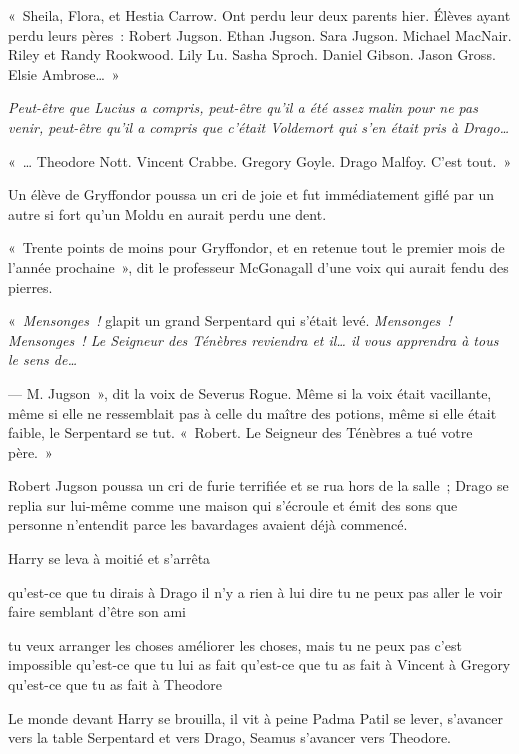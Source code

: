 «~Sheila, Flora, et Hestia Carrow. Ont perdu leur deux parents hier. Élèves ayant perdu leurs pères~: Robert Jugson. Ethan Jugson. Sara Jugson. Michael MacNair. Riley et Randy Rookwood. Lily Lu. Sasha Sproch. Daniel Gibson. Jason Gross. Elsie Ambrose…~»

\emph{Peut-être que Lucius a compris, peut-être qu'il a été assez malin pour ne pas venir, peut-être qu'il a compris que c'était Voldemort qui s'en était pris à Drago…}

«~… Theodore Nott. Vincent Crabbe. Gregory Goyle. Drago Malfoy. C'est tout.~»

Un élève de Gryffondor poussa un cri de joie et fut immédiatement giflé par un autre si fort qu'un Moldu en aurait perdu une dent.

«~Trente points de moins pour Gryffondor, et en retenue tout le premier mois de l'année prochaine~», dit le professeur McGonagall d'une voix qui aurait fendu des pierres.

«~\emph{Mensonges~!} glapit un grand Serpentard qui s'était levé. \emph{Mensonges~! Mensonges~! Le Seigneur des Ténèbres reviendra et il… il vous apprendra à tous le sens de…}

--- M. Jugson~», dit la voix de Severus Rogue. Même si la voix était vacillante, même si elle ne ressemblait pas à celle du maître des potions, même si elle était faible, le Serpentard se tut. «~Robert. Le Seigneur des Ténèbres a tué votre père.~»

Robert Jugson poussa un cri de furie terrifiée et se rua hors de la salle~; Drago se replia sur lui-même comme une maison qui s'écroule et émit des sons que personne n'entendit parce les bavardages avaient déjà commencé.

Harry se leva à moitié et s'arrêta

qu'est-ce que tu dirais à Drago il n'y a rien à lui dire tu ne peux pas aller le voir faire semblant d'être son ami

tu veux arranger les choses améliorer les choses, mais tu ne peux pas c'est impossible qu'est-ce que tu lui as fait qu'est-ce que tu as fait à Vincent à Gregory qu'est-ce que tu as fait à Theodore

Le monde devant Harry se brouilla, il vit à peine Padma Patil se lever, s'avancer vers la table Serpentard et vers Drago, Seamus s'avancer vers Theodore.

